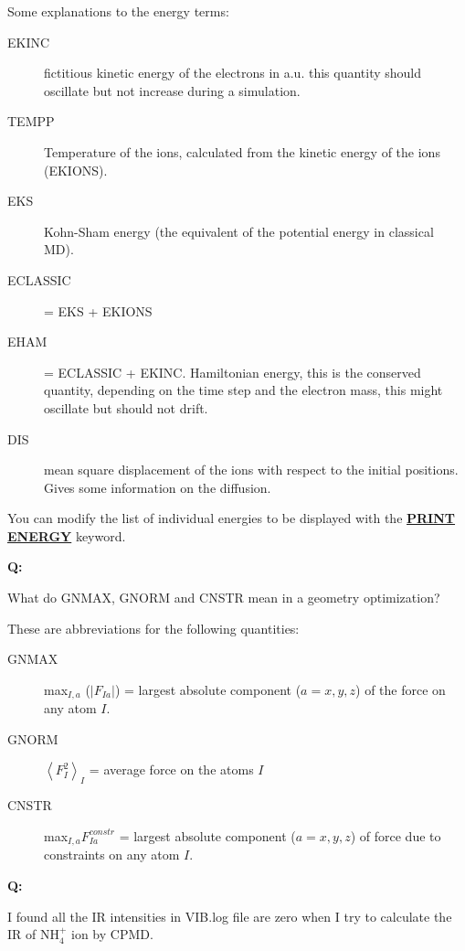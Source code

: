 \documentclass[twoside,10pt,titlepage,a4paper]{article}
\newcommand{\referto}[2]{\hyperlink{#1}{#2}}
\newcommand{\reflabel}[1]{\hypertarget{#1}}
\newcommand{\referto}[2]{\htmlref{#2}{#1}}
\newcommand{\reflabel}[1]{\label{#1}}
\newcommand{\faqquestion}[1]{\vspace{2ex}\reflabel{faq#1}{{\bf Q:\ }}}
\newcommand{\faqanswer}{\vspace{1ex}{{\bf A:\ }}}
\newcommand{\refkeyword}[1]{%
\referto{#1}{\textbf{#1}}%
\index{#1}%
}%
\begin{document}
\faqanswer
Some explanations to the energy terms:

\begin{description}
\item[EKINC] fictitious kinetic energy of the electrons in a.u.
           this quantity should oscillate but not increase during a
           simulation.
\item[TEMPP] Temperature of the ions, calculated from the kinetic
           energy of the ions (EKIONS).
\item[EKS]   Kohn-Sham energy (the equivalent of the potential energy
           in classical MD).
\item[ECLASSIC] = EKS + EKIONS
\item[EHAM]     = ECLASSIC + EKINC.
           Hamiltonian energy, this is the conserved
           quantity, depending on the time step and
           the electron mass, this might oscillate but
           should not drift.
\item[DIS]    mean square displacement of the ions with respect to
           the initial positions. Gives some information on the diffusion.
\end{description}

You can modify the list of individual energies to be displayed
with the \refkeyword{PRINT ENERGY} keyword.

\faqquestion{gnmax}
What do GNMAX, GNORM and CNSTR mean in a geometry optimization?

\faqanswer
These are abbreviations for the following quantities:
\begin{description}
\item[GNMAX] max${}_{I,a}$ ($|F_{Ia}| $) = largest absolute
  component ($a=x,y,z$) of the force on any atom $I$.
\item[GNORM] $\left< F_{I}^2\right>_{I}$ = average force on the atoms $I$
\item[CNSTR] max${}_{I,a} { F^{constr}_{Ia} }$ = largest absolute
  component ($a=x,y,z$) of force due to constraints on any atom $I$.
\end{description}


\faqquestion{ir-int}
I found all the IR intensities in VIB.log file are zero when I try to
calculate the IR of NH${}_4^+$ ion by CPMD.
\end{document}
